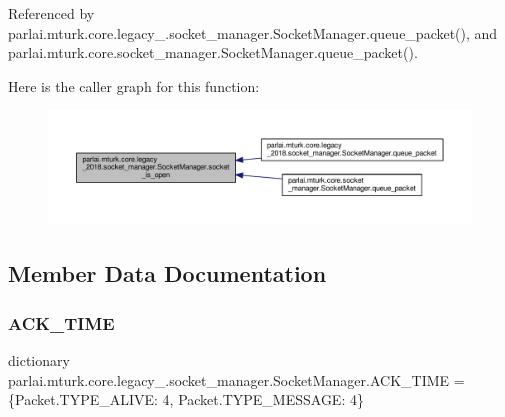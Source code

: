 Referenced by parlai.\+mturk.\+core.\+legacy\+\_.\+socket\+\_\+manager.\+Socket\+Manager.\+queue\+\_\+packet(), and parlai.\+mturk.\+core.\+socket\+\_\+manager.\+Socket\+Manager.\+queue\+\_\+packet().

Here is the caller graph for this function\+:
\nopagebreak
\begin{figure}[H]
\begin{center}
\leavevmode
\includegraphics[width=350pt]{classparlai_1_1mturk_1_1core_1_1legacy__2018_1_1socket__manager_1_1SocketManager_a8fa0c55682c0eb89ba4f4d7dcfd9fdba_icgraph}
\end{center}
\end{figure}


\subsection{Member Data Documentation}
\mbox{\label{classparlai_1_1mturk_1_1core_1_1legacy__2018_1_1socket__manager_1_1SocketManager_ad736ebbf4b90b971990315a51a05f989}} 
\subsubsection{\texorpdfstring{A\+C\+K\+\_\+\+T\+I\+ME}{ACK\_TIME}}
{\footnotesize\ttfamily dictionary parlai.\+mturk.\+core.\+legacy\+\_.\+socket\+\_\+manager.\+Socket\+Manager.\+A\+C\+K\+\_\+\+T\+I\+ME = \{Packet.\+T\+Y\+P\+E\+\_\+\+A\+L\+I\+V\+E\+: 4, Packet.\+T\+Y\+P\+E\+\_\+\+M\+E\+S\+S\+A\+G\+E\+: 4\}\hspace{0.3cm}{\ttfamily [static]}}



